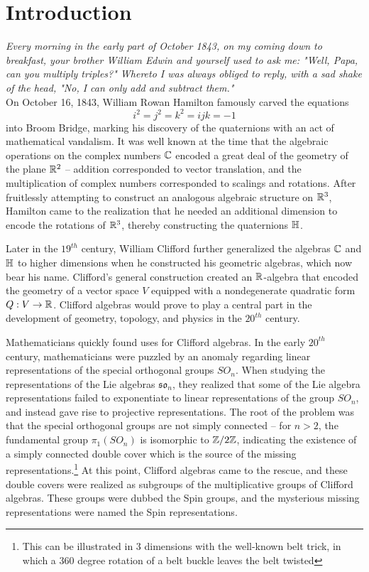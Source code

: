 %
\chapter*{Introduction}
%
\subsectionend $ $\\
\emph{Every morning in the early part of October 1843, on my coming down to
breakfast, your brother William Edwin and yourself used to ask me: "Well,
Papa, can you multiply triples?" Whereto I was always obliged to reply, with a
sad shake of the head, "No, I can only add and subtract them."}\\
%
%
\subsectionend $ $\\
%

On October 16, 1843, William Rowan Hamilton famously carved the equations
\[
i^2 = j^2 = k^2 = ijk = -1
\]
into Broom Bridge, marking his discovery of the quaternions with an act of
mathematical vandalism. It was well known at the time that the algebraic operations
on the complex numbers $\mathbb{C}$ encoded a great deal of the geometry of the plane
$\mathbb{R}^2$ -- addition corresponded to vector translation, and the multiplication of
complex numbers corresponded to scalings and rotations. After fruitlessly attempting
to construct an analogous algebraic structure on $\mathbb{R}^3$, Hamilton came to the
realization that he needed an additional dimension to encode the rotations
of $\mathbb{R}^3$, thereby constructing the quaternions $\mathbb{H}$.

Later in the $19^{th}$ century, William Clifford further generalized the algebras
$\mathbb{C}$ and $\mathbb{H}$ to higher dimensions when he constructed his geometric algebras,
which now bear his name. Clifford's general construction created an $\mathbb{R}$-algebra
that encoded the geometry of a vector space $V$ equipped with a nondegenerate
quadratic form $Q : V \to \mathbb{R}$. Clifford algebras would prove to play a central
part in the development of geometry, topology, and physics in the $20^{th}$
century.

Mathematicians quickly found uses for Clifford algebras. In the early $20^{th}$ century,
mathematicians were puzzled by an anomaly
regarding linear representations of the special orthogonal groups $SO_n$.
When studying the representations of the Lie algebras $\mathfrak{so}_n$,
they realized that some of the Lie algebra representations failed to
exponentiate to linear representations of the group $SO_n$, and instead
gave rise to projective representations. The root of the problem was
that the special orthogonal groups are not simply connected --
for $n > 2$, the fundamental group $\pi_1(SO_n)$ is isomorphic to
$\mathbb{Z}/2\mathbb{Z}$, indicating the existence of a simply connected double cover
which is the source of the missing representations.\footnote{This can be
illustrated in 3 dimensions with the well-known belt trick, in which a 360
degree rotation of a belt buckle leaves the belt twisted}
At this point, Clifford algebras came to the rescue, and these double
covers were realized as subgroups of the multiplicative groups of Clifford
algebras. These groups were dubbed the Spin groups, and the mysterious missing
representations were named the Spin representations.

